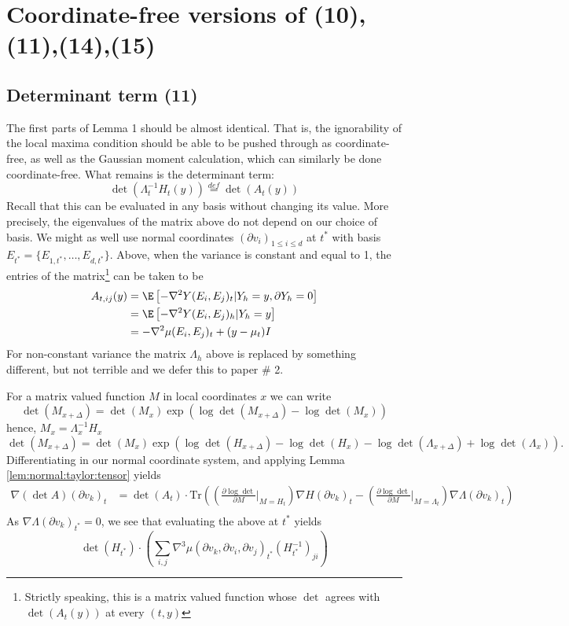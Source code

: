 \documentclass{article}
\begin{document}
\section{Coordinate-free versions of (10),(11),(14),(15)}

\subsection{Determinant term (11)}

The first parts of Lemma 1 should be almost identical. That is, the ignorability
of the local maxima condition should be able to be pushed through as coordinate-free,
as well as the Gaussian moment calculation, which can similarly be done coordinate-free. What remains is the determinant term:
$$
\det(\Lambda_t^{-1} H_t(y)) \overset{def}{=} \det(A_t(y))
$$
Recall that this can be evaluated in any basis without changing its value. More precisely, the eigenvalues
of the matrix above do not depend on our choice of basis.
We might as well use normal coordinates $(\partial v_i)_{1 \leq i \leq d}$ at $t^*$ with basis $E_{t^*}=\{E_{1,t^*}, \dots, E_{d,t^*}\}$.
Above, when the variance is constant and equal to 1, the entries of the matrix\footnote{Strictly speaking, this is a matrix valued function whose $\det$ agrees with $\det(A_t(y))$ at every $(t,y)$} can be taken to be
$$
\begin{aligned}
A_{t,ij}(y) &= \E \left[-\nabla^2 Y(E_i, E_j)_t | Y_h=y, \partial Y_h=0\right] \\
&= \E \left[-\nabla^2 Y(E_i, E_j)_h | Y_h=y\right] \\
&= - \nabla^2 \mu(E_i, E_j)_t + (y - \mu_t) I \\
\end{aligned}
$$
For non-constant variance the matrix $\Lambda_h$ above is replaced by something different, but not terrible and we defer this to paper \# 2.

For a matrix valued function $M$ in local coordinates $x$ we can write
$$
\det(M_{x+\Delta}) = \det(M_{x}) \exp(\log \det(M_{x+\Delta}) - \log \det( M_{x}))
$$
hence, $M_x = \Lambda_x^{-1}H_x$
$$
\det(M_{x+\Delta}) = \det(M_{x}) \exp(\log \det(H_{x+\Delta}) - \log \det( H_{x}) - \log \det(\Lambda_{x+\Delta}) + \log \det(\Lambda_x)).
$$
Differentiating in our normal coordinate system, and applying Lemma \ref{lem:normal:taylor:tensor} yields
$$
\begin{aligned}
  \nabla (\det A)(\partial v_k)_{t} &= \det(A_{t}) \cdot \text{Tr}\left(\left(\frac{\partial \log \det}{\partial M}\biggl|_{M=H_t}\right) \nabla H(\partial v_k)_t - \left(\frac{\partial \log \det}{\partial M}\biggl|_{M=\Lambda_t}\right) \nabla \Lambda(\partial v_k)_t\right) \\
\end{aligned}
$$
As $\nabla \Lambda(\partial v_k)_{t^*}=0$, we see that evaluating
the above at $t^*$ yields
$$
\det(H_{t^*}) \cdot \left(\sum_{i,j} \nabla^3 \mu(\partial v_k, \partial v_i, \partial v_j)_{t^*} (H_{t^*}^{-1})_{ji} \right)
$$
\end{document}
